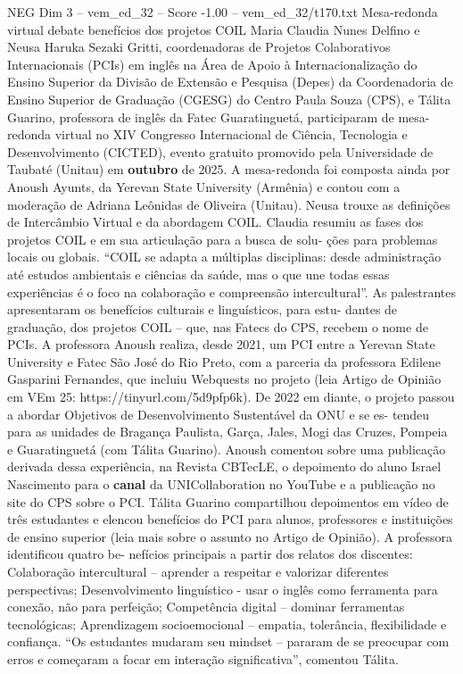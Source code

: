\begin{textsample}{NEG Dim 3 – vem\_ed\_32 – Score -1.00 – vem\_ed\_32/t170.txt}  \label{ex:f3_neg_006}
Mesa-redonda virtual debate benefícios dos projetos COIL Maria Claudia Nunes Delfino e Neusa Haruka Sezaki Gritti, coordenadoras de Projetos Colaborativos Internacionais (PCIs) em inglês na Área de Apoio à Internacionalização do Ensino Superior da Divisão de Extensão e Pesquisa (Depes) da Coordenadoria de Ensino Superior de Graduação (CGESG) do Centro Paula Souza (CPS), e Tálita Guarino, professora de inglês da Fatec Guaratinguetá, participaram de mesa-redonda virtual no XIV Congresso Internacional de Ciência, Tecnologia e Desenvolvimento (CICTED), evento gratuito promovido pela Universidade de Taubaté (Unitau) em \textbf{outubro} de 2025.
A mesa-redonda foi composta ainda por Anoush Ayunts, da Yerevan State University (Armênia) e contou com a moderação de Adriana Leônidas de Oliveira (Unitau).
Neusa trouxe as definições de Intercâmbio Virtual e da abordagem COIL.
Claudia resumiu as fases dos projetos COIL e em sua articulação para a busca de solu- ções para problemas locais ou globais. “COIL se adapta a múltiplas disciplinas: desde administração até estudos ambientais e ciências da saúde, mas o que une todas essas experiências é o foco na colaboração e compreensão intercultural”.
As palestrantes apresentaram os benefícios culturais e linguísticos, para estu- dantes de graduação, dos projetos COIL – que, nas Fatecs do CPS, recebem o nome de PCIs.
A professora Anoush realiza, desde 2021, um PCI entre a Yerevan State University e Fatec São José do Rio Preto, com a parceria da professora Edilene Gasparini Fernandes, que incluiu Webquests no projeto (leia Artigo de Opinião em VEm 25: https://tinyurl.com/5d9pfp6k).
De 2022 em diante, o projeto passou a abordar Objetivos de Desenvolvimento Sustentável da ONU e se es- tendeu para as unidades de Bragança Paulista, Garça, Jales, Mogi das Cruzes, Pompeia e Guaratinguetá (com Tálita Guarino).
Anoush comentou sobre uma publicação derivada dessa experiência, na Revista CBTecLE, o depoimento do aluno Israel Nascimento para o \textbf{canal} da UNICollaboration no YouTube e a publicação no site do CPS sobre o PCI.
Tálita Guarino compartilhou depoimentos em vídeo de três estudantes e elencou benefícios do PCI para alunos, professores e instituições de ensino superior (leia mais sobre o assunto no Artigo de Opinião).
A professora identificou quatro be- nefícios principais a partir dos relatos dos discentes: Colaboração intercultural – aprender a respeitar e valorizar diferentes perspectivas; Desenvolvimento linguístico - usar o inglês como ferramenta para conexão, não para perfeição; Competência digital – dominar ferramentas tecnológicas; Aprendizagem socioemocional – empatia, tolerância, flexibilidade e confiança. “Os estudantes mudaram seu mindset – pararam de se preocupar com erros e começaram a focar em interação significativa”, comentou Tálita.

\end{textsample}
